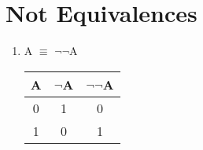 \documentclass{report}
\begin{document}
\section{Not Equivalences}
\begin{enumerate}

  \item A $\equiv$ $\neg$$\neg$A

\begin{center}
  \begin{tabular}{| c | c | c |}
    \hline
    A & $\neg$A & $\neg$$\neg$A \\ \hline
    0 & 1 & 0 \\
    1 & 0 & 1 \\ \hline
  \end{tabular}
\end{center}

\end{enumerate}
\end{document}
